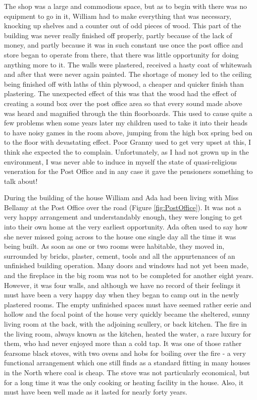 The shop was a large and commodious space, but as to begin with there was no equipment to go in it, William had to make everything that was necessary, knocking up shelves and a counter out of odd pieces of wood. This part of the building was never really finished off properly, partly because of the lack of money, and partly because it was in such constant use once the post office and store began to operate from there, that there was little opportunity for doing anything more to it. The walls were plastered, received a hasty coat of whitewash and after that were never again painted. The shortage of money led to the ceiling being finished off with laths of thin plywood, a cheaper and quicker finish than plastering. The unexpected effect of this was that the wood had the effect of creating a sound box over the post office area so that every sound made above was heard and magnified through the thin floorboards. This used to cause quite a few problems when some years later my children used to take it into their heads to have noisy games in the room above, jumping from the high box spring bed on to the floor with devastating effect. Poor Granny used to get very upset at this, I think she expected the  to complain. Unfortunately, as I had not grown up in the environment, I was never able to induce in myself the state of quasi-religious veneration for the Post Office and in any case it gave the pensioners something to talk about!



During the building of the house William and Ada had been living with Miss Bellamy at the Post Office over the road (Figure \ref{fig:PostOffice}). It was not a very happy arrangement and understandably enough, they were longing to get into their own home at the very earliest opportunity. Ada often used to say how she never missed going across to the house one single day all the time it was being built. As soon as one or two rooms were habitable, they moved in, surrounded by bricks, plaster, cement, tools and all the appurtenances of an unfinished building operation. Many doors and windows had not yet been made, and the fireplace in the big room was not to be completed for another eight years. However, it was four walls, and although we have no record of their feelings it must have been a very happy day when they began to camp out in the newly plastered rooms. The empty unfinished spaces must have seemed rather eerie and hollow and the focal point of the house very quickly became the sheltered, sunny living room at the back, with the adjoining scullery, or back kitchen. The fire in the living room, always known as the kitchen, heated the water, a rare luxury for them, who had never enjoyed more than a cold tap. It was one of those rather fearsome black stoves, with two ovens and hobs for boiling over the fire - a very functional arrangement which one still finds as a standard fitting in many houses in the North where coal is cheap. The stove was not particularly economical, but for a long time it was the only cooking or heating facility in the house. Also, it must have been well made as it lasted for nearly forty years.

